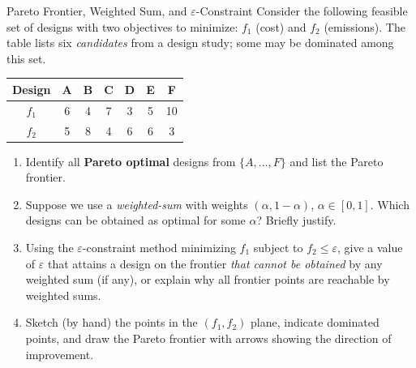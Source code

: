 
\begin{ex}{Pareto Frontier, Weighted Sum, and $\varepsilon$-Constraint}{}
\label{ex:pareto-table}
Consider the following feasible set of designs with two objectives to minimize: $f_1$ (cost) and $f_2$ (emissions).
The table lists six \emph{candidates} from a design study; some may be dominated among this set.

\begin{center}
\begin{tabular}{c|cccccc}
Design & A & B & C & D & E & F \\\hline
$f_1$  & 6 & 4 & 7 & 3 & 5 & 10 \\
$f_2$  & 5 & 8 & 4 & 6 & 6 & 3 \\
\end{tabular}
\par{}\label{tab:multi-objective-optimization_updated-tab02}%

\end{center}

\begin{enumerate}
\item Identify all \textbf{Pareto optimal} designs from $\{A,\ldots,F\}$ and list the Pareto frontier.
\vspace{2cm}

\item Suppose we use a \emph{weighted-sum} with weights $(\alpha,1-\alpha)$, $\alpha\in[0,1]$. Which designs can be obtained as optimal for some $\alpha$? Briefly justify.

\vspace{2cm}

\item Using the $\varepsilon$-constraint method minimizing $f_1$ subject to $f_2\le \varepsilon$, give a value of $\varepsilon$ that attains a design on the frontier \emph{that cannot be obtained} by any weighted sum (if any), or explain why all frontier points are reachable by weighted sums.

\vspace{2cm}

\item Sketch (by hand) the points in the $(f_1,f_2)$ plane, indicate dominated points, and draw the Pareto frontier with arrows showing the direction of improvement.

\vspace{6cm}
\end{enumerate}
\end{ex}

